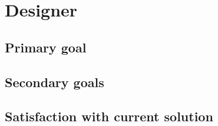 \section{Designer}

\subsection{Primary goal}
\subsection{Secondary goals}
\subsection{Satisfaction with current solution}